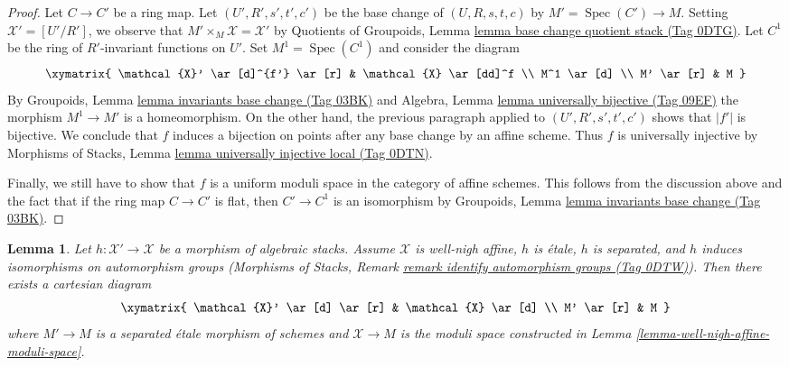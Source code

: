 \documentclass{amsart}
\theoremstyle{plain}
\newtheorem{lemma}[subsection]{Lemma}
\theoremstyle{definition}
\theoremstyle{remark}
\numberwithin{equation}{subsection}
\def\Spec{\mathop{\mathrm{Spec}}}
\begin{document}
\begin{proof}
\medskip\noindent
Let $C \to C'$ be a ring map. Let $(U', R', s', t', c')$ be
the base change of $(U, R, s, t, c)$ by $M' = \Spec(C') \to M$.
Setting $\mathcal{X}' = [U'/R']$, we observe that
$M' \times_M \mathcal{X} = \mathcal{X}'$ by
Quotients of Groupoids, Lemma
\href{https://stacks.math.columbia.edu/tag/0DTG}{lemma base change quotient stack (Tag 0DTG)}.
Let $C^1$ be the ring of $R'$-invariant functions on $U'$.
Set $M^1 = \Spec(C^1)$ and consider the diagram
$$
\xymatrix{
\mathcal{X}' \ar[d]^{f'} \ar[r] & \mathcal{X} \ar[dd]^f \\
M^1 \ar[d] \\
M' \ar[r] & M
}
$$
By Groupoids, Lemma \href{https://stacks.math.columbia.edu/tag/03BK}{lemma invariants base change (Tag 03BK)} and
Algebra, Lemma \href{https://stacks.math.columbia.edu/tag/09EF}{lemma universally bijective (Tag 09EF)}
the morphism $M^1 \to M'$ is a homeomorphism.
On the other hand, the previous paragraph applied to
$(U', R', s', t', c')$ shows that $|f'|$ is bijective.
We conclude that $f$ induces a bijection on points after any
base change by an affine scheme. Thus $f$ is universally injective
by Morphisms of Stacks, Lemma
\href{https://stacks.math.columbia.edu/tag/0DTN}{lemma universally injective local (Tag 0DTN)}.

\medskip\noindent
Finally, we still have to show that $f$ is a uniform moduli space
in the category of affine schemes. This follows from the discussion
above and the fact that if the
ring map $C \to C'$ is flat, then $C' \to C^1$ is an isomorphism
by Groupoids, Lemma \href{https://stacks.math.columbia.edu/tag/03BK}{lemma invariants base change (Tag 03BK)}.
\end{proof}


\begin{lemma}
\label{lemma-etale-separated-over-well-nigh-affine}
Let $h : \mathcal{X}' \to \mathcal{X}$ be a morphism of algebraic stacks.
Assume $\mathcal{X}$ is well-nigh affine, $h$ is \'etale, $h$ is separated,
and $h$ induces isomorphisms on automorphism groups
(Morphisms of Stacks, Remark
\href{https://stacks.math.columbia.edu/tag/0DTW}{remark identify automorphism groups (Tag 0DTW)}).
Then there exists a cartesian diagram
$$
\xymatrix{
\mathcal{X}' \ar[d] \ar[r] & \mathcal{X} \ar[d] \\
M' \ar[r] & M
}
$$
where $M' \to M$ is a separated \'etale morphism of schemes and
$\mathcal{X} \to M$ is the moduli space constructed in
Lemma \ref{lemma-well-nigh-affine-moduli-space}.
\end{lemma}
\end{document}
